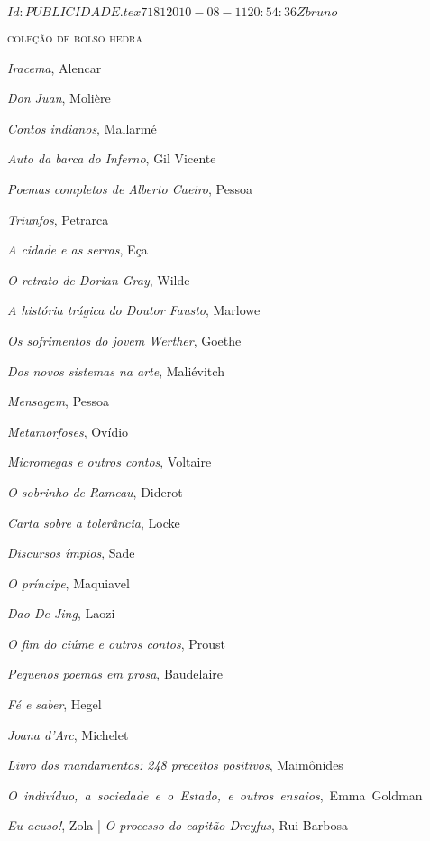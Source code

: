\SVN $Id: PUBLICIDADE.tex 7181 2010-08-11 20:54:36Z bruno $ 

\pagestyle{empty}
\ifodd\thepage\paginabranca\else\clearpage\fi
\textsc{coleção de bolso hedra}
\begin{enumerate}
\setlength\itemsep{-1.4mm}
{
\tiny
\item \textit{Iracema}, Alencar
\item \textit{Don Juan}, Molière
\item \textit{Contos indianos}, Mallarmé
\item \textit{Auto da barca do Inferno}, Gil Vicente
\item \textit{Poemas completos de Alberto Caeiro}, Pessoa
\item \textit{Triunfos}, Petrarca
\item \textit{A cidade e as serras}, Eça
\item \textit{O retrato de Dorian Gray}, Wilde
\item \textit{A história trágica do Doutor Fausto}, Marlowe
\item \textit{Os sofrimentos do jovem Werther}, Goethe
\item \textit{Dos novos sistemas na arte}, Maliévitch
\item \textit{Mensagem}, Pessoa
\item \textit{Metamorfoses}, Ovídio
\item \textit{Micromegas e outros contos}, Voltaire
\item \textit{O sobrinho de Rameau}, Diderot
\item \textit{Carta sobre a tolerância}, Locke
\item \textit{Discursos ímpios}, Sade
\item \textit{O príncipe}, Maquiavel
\item \textit{Dao De Jing}, Laozi
\item \textit{O fim do ciúme e outros contos}, Proust
\item \textit{Pequenos poemas em prosa}, Baudelaire
\item \textit{Fé e saber}, Hegel
\item \textit{Joana d'Arc}, Michelet
\item \textit{Livro dos mandamentos: 248 preceitos positivos}, Maimônides
\item \mbox{\textit{O indivíduo, a sociedade e o Estado, e outros ensaios}, 
		Emma Goldman}
\item \textit{Eu acuso!}, Zola | \textit{O processo do capitão Dreyfus}, Rui Barbosa
}
\end{enumerate}
